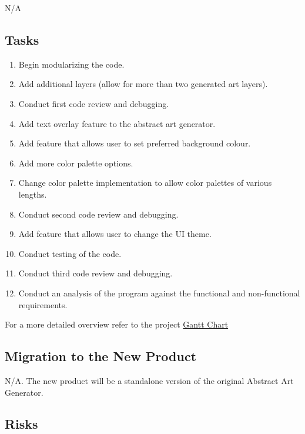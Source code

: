 \documentclass[12pt, titlepage]{article}
\begin{document}
N/A

\subsection{Tasks}

\begin{enumerate}
    \item Begin modularizing the code.
    \item Add additional layers (allow for more than two generated art layers).
    \item Conduct first code review and debugging.
    \item Add text overlay feature to the abstract art generator.
    \item Add feature that allows user to set preferred background colour.
    \item \color{red} Add more color palette options.\color{black}
    \item \color{red} Change color palette implementation to allow color palettes of various lengths.\color{black}
    \item Conduct second code review and debugging.
    \item Add feature that allows user to change the UI theme.
    \item Conduct testing of the code.
    \item Conduct third code review and debugging.
    \item Conduct an analysis of the program against the functional and non-functional requirements.
\end{enumerate}

For a more detailed overview refer to the project \href{https://gitlab.cas.mcmaster.ca/3xa3-l3-g10/3xa3-l3-g10/-/tree/main/ProjectSchedule}{Gantt Chart}

\subsection{Migration to the New Product}

N/A. The new product will be a standalone version of the original Abstract Art Generator.

\subsection{Risks}
\end{document}
